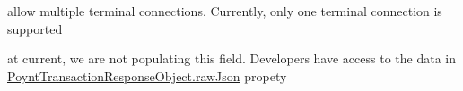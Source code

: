 
\begin{DoxyRefList}
\item[\label{todo__todo000001}%
\hypertarget{todo__todo000001}{}%
Class \hyperlink{interface_poynt_terminal}{Poynt\+Terminal} ]allow multiple terminal connections. Currently, only one terminal connection is supported  
\item[\label{todo__todo000002}%
\hypertarget{todo__todo000002}{}%
Global \hyperlink{interface_poynt_transaction_object_ab4cac3360e86d21570d89915c99e6943}{Poynt\+Transaction\+Object\+:\+:funding\+Source} ]at current, we are not populating this field. Developers have access to the data in \hyperlink{interface_poynt_transaction_response_object_a0046f618ca04fd1e7fcf91b87190a944}{Poynt\+Transaction\+Response\+Object.\+raw\+Json} propety 
\end{DoxyRefList}